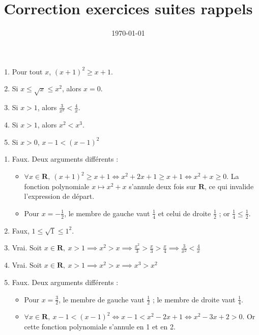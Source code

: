 \documentclass[a4paper,12pt,french]{article}
\title{Correction exercices suites rappels}
\date{\today}
\newcommand{\R}{\mathbf{R}}
\begin{document}
\maketitle

\begin{Exercise}[number=1,title={Vrai-faux}]
 \begin{enumerate}
    \item Pour tout $x$, $(x+1)^2 \geqslant x+1$.
    \item Si $x \leqslant \sqrt{x} \leqslant x^2$, alors $x=0$.
    \item Si $x > 1$, alors $\frac3{x^2} < \frac4x$.
    \item Si $x > 1$, alors $x^2 < x^3$.
    \item Si $x > 0$, $x-1 < (x-1)^2$
  \end{enumerate}
\end{Exercise}
\begin{Answer}
  \begin{enumerate}
    \item Faux. Deux arguments différents :
      \begin{itemize}
        \item $\forall x\in\R,\ (x+1)^2 \geqslant x+1 \iff x^2 + 2x +1
          \geqslant x+1 \iff x^2 + x \geqslant 0$. La fonction
          polynomiale $x\mapsto x^2 + x$ s'annule deux fois sur $\R$, ce
          qui invalide l'expression de départ.
        \item Pour $x=-\frac12$, le membre de gauche vaut $\frac14$ et
          celui de droite $\frac12$ ; or $\frac14 \leqslant \frac12$.
      \end{itemize}
    \item Faux, $1 \leqslant \sqrt1 \leqslant 1^2$.
    \item Vrai. Soit $x\in\R,\ x > 1 \implies x^2 > x \implies
      \frac{x^2}3 > \frac{x}{3} > \frac{x}{4} \implies \frac3{x^2} <
      \frac{4}{x}$
    \item Vrai. Soit $x\in\R,\ x > 1 \implies x^2 > x \implies x^3 >
      x^2$
    \item Faux. Deux arguments différents :
      \begin{itemize}
        \item Pour $x=\frac32$, le membre de gauche vaut $\frac12$ ; le
          membre de droite vaut $\frac14$.
        \item $\forall x\in\R,\ x-1 < (x-1)^2 \iff x-1 < x^2 -2x +1 \iff
          x^2 -3x +2 > 0$. Or cette fonction polynomiale s'annule en 1
          et en 2.
      \end{itemize}
  \end{enumerate}
\end{Answer}
\end{document}
